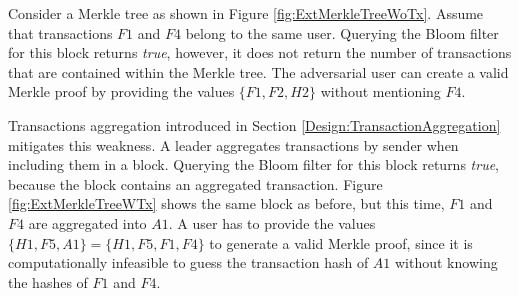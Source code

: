 \begin{example}
\label{ex:ExtMerkleTree}
Consider a Merkle tree as shown in Figure \ref{fig:ExtMerkleTreeWoTx}. Assume that transactions $F1$ and $F4$ belong to the same user. Querying the Bloom filter for this block returns \textit{true}, however, it does not return the number of transactions that are contained within the Merkle tree. The adversarial user can create a valid Merkle proof by providing the values $\{F1, F2, H2\}$ without mentioning $F4$. 

Transactions aggregation introduced in Section \ref{Design:TransactionAggregation} mitigates this weakness. A leader aggregates transactions by sender when including them in a block. Querying the Bloom filter for this block returns \textit{true}, because the block contains an aggregated transaction. Figure \ref{fig:ExtMerkleTreeWTx} shows the same block as before, but this time, $F1$ and $F4$ are aggregated into $A1$. A user has to provide the values $\{H1, F5, A1\} = \{H1, F5, F1, F4\}$ to generate a valid Merkle proof, since it is computationally infeasible to guess the transaction hash of $A1$ without knowing the hashes of $F1$ and $F4$.
\begin{figure}[hbt]
\centering
\begin{subfigure}[b]{0.48\textwidth}
\centering
{}
\end{subfigure}
\end{figure}
\end{example}

